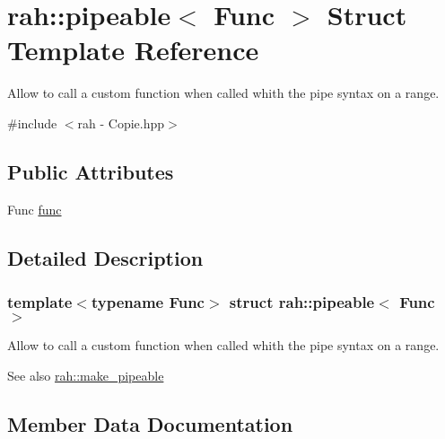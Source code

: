 \hypertarget{structrah_1_1pipeable}{}\section{rah\+::pipeable$<$ Func $>$ Struct Template Reference}
\label{structrah_1_1pipeable}


Allow to call a custom function when called whith the \textquotesingle{}pipe\textquotesingle{} syntax on a range.  




{\ttfamily \#include $<$rah -\/ Copie.\+hpp$>$}

\subsection*{Public Attributes}
\begin{DoxyCompactItemize}
\item 
Func \mbox{\hyperlink{structrah_1_1pipeable_a2d26d18babf4edf2303bdb8b9a9dd165}{func}}
\end{DoxyCompactItemize}


\subsection{Detailed Description}
\subsubsection*{template$<$typename Func$>$\newline
struct rah\+::pipeable$<$ Func $>$}

Allow to call a custom function when called whith the \textquotesingle{}pipe\textquotesingle{} syntax on a range. 

\begin{DoxySeeAlso}{See also}
\mbox{\hyperlink{namespacerah_a9beb2a94a054fd0caefd5a20b1c0f0d9}{rah\+::make\+\_\+pipeable}} 
\end{DoxySeeAlso}


\subsection{Member Data Documentation}
\mbox{\label{structrah_1_1pipeable_a2d26d18babf4edf2303bdb8b9a9dd165}} 
